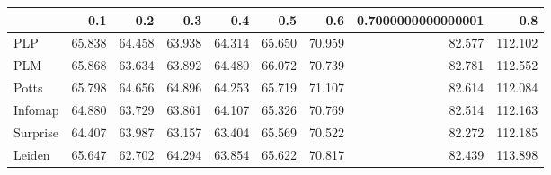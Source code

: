 \begin{tabular}{lrrrrrrrr}
\toprule
{} &    0.1 &    0.2 &    0.3 &    0.4 &    0.5 &    0.6 & 0.7000000000000001 &     0.8 \\
\midrule
PLP      & 65.838 & 64.458 & 63.938 & 64.314 & 65.650 & 70.959 &             82.577 & 112.102 \\
PLM      & 65.868 & 63.634 & 63.892 & 64.480 & 66.072 & 70.739 &             82.781 & 112.552 \\
Potts    & 65.798 & 64.656 & 64.896 & 64.253 & 65.719 & 71.107 &             82.614 & 112.084 \\
Infomap  & 64.880 & 63.729 & 63.861 & 64.107 & 65.326 & 70.769 &             82.514 & 112.163 \\
Surprise & 64.407 & 63.987 & 63.157 & 63.404 & 65.569 & 70.522 &             82.272 & 112.185 \\
Leiden   & 65.647 & 62.702 & 64.294 & 63.854 & 65.622 & 70.817 &             82.439 & 113.898 \\
\bottomrule
\end{tabular}
